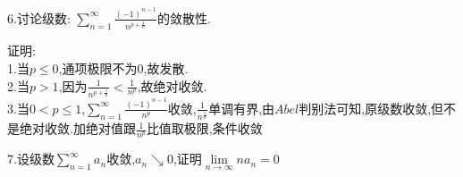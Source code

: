 \documentclass{ctexart}
\begin{document}
\begin{tcolorbox}[title = {综合性问题},colbacktitle=red!25!white,colback=white,arc = 2mm, outer arc = 2mm,fonttitle = \itshape, fontupper = \itshape, fontlower = \itshape]
   6.讨论级数:
	$\displaystyle{\sum_{n=1}^{\infty}\frac{(-1)^{n-1}}{n^{p+\frac{1}{n}}}}$的敛散性.\\
	\begin{tcolorbox}[colback=white,arc = 1mm, outer arc = 1mm,fonttitle = \itshape, fontupper = \itshape, fontlower = \itshape]
		{\color{red}证明:}\\
		1.当$p \le 0$,通项极限不为0,故发散.\\
		2.当$p > 1$,因为$\displaystyle{\frac{1}{n^{p+\frac{1}{n}}} < \frac{1}{n^{p}}}$,故绝对收敛.\\
		3.当$0 < p \le 1$,$\displaystyle{\sum_{n=1}^{\infty}\frac{(-1)^{n-1}}{n^{p}}}$收敛,$\displaystyle{\frac{1}{n^{\frac{1}{n}}}}$单调有界,由$Abel$判别法可知,原级数收敛,但不是绝对收敛.加绝对值跟$\displaystyle{\frac{1}{n^{p}}}$比值取极限,条件收敛
	\end{tcolorbox}
	7.设级数$\displaystyle{\sum_{n=1}^{\infty}a_{n}}$收敛,$a_{n}\searrow 0 $,证明$\lim\limits_{n \to \infty} na_{n}=0$\\
\end{tcolorbox}
\end{document}
